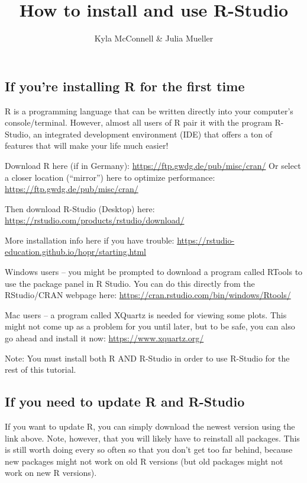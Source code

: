 \documentclass[
]{article}
\title{How to install and use R-Studio}
\author{Kyla McConnell \& Julia Mueller}
\date{}
\begin{document}
\maketitle

\hypertarget{if-youre-installing-r-for-the-first-time}{%
\subsection{If you're installing R for the first
time}\label{if-youre-installing-r-for-the-first-time}}

R is a programming language that can be written directly into your
computer's console/terminal. However, almost all users of R pair it with
the program R-Studio, an integrated development environment (IDE) that
offers a ton of features that will make your life much easier!

Download R here (if in Germany):
\url{https://ftp.gwdg.de/pub/misc/cran/} Or select a closer location
(``mirror'') here to optimize performance:
\url{https://ftp.gwdg.de/pub/misc/cran/}

Then download R-Studio (Desktop) here:
\url{https://rstudio.com/products/rstudio/download/}

More installation info here if you have trouble:
\url{https://rstudio-education.github.io/hopr/starting.html}

Windows users -- you might be prompted to download a program called
RTools to use the package panel in R Studio. You can do this directly
from the RStudio/CRAN webpage here:
\url{https://cran.rstudio.com/bin/windows/Rtools/}

Mac users -- a program called XQuartz is needed for viewing some plots.
This might not come up as a problem for you until later, but to be safe,
you can also go ahead and install it now: \url{https://www.xquartz.org/}

Note: You must install both R AND R-Studio in order to use R-Studio for
the rest of this tutorial.

\hypertarget{if-you-need-to-update-r-and-r-studio}{%
\subsection{If you need to update R and
R-Studio}\label{if-you-need-to-update-r-and-r-studio}}

If you want to update R, you can simply download the newest version
using the link above. Note, however, that you will likely have to
reinstall all packages. This is still worth doing every so often so that
you don't get too far behind, because new packages might not work on old
R versions (but old packages might not work on new R versions).
\end{document}
